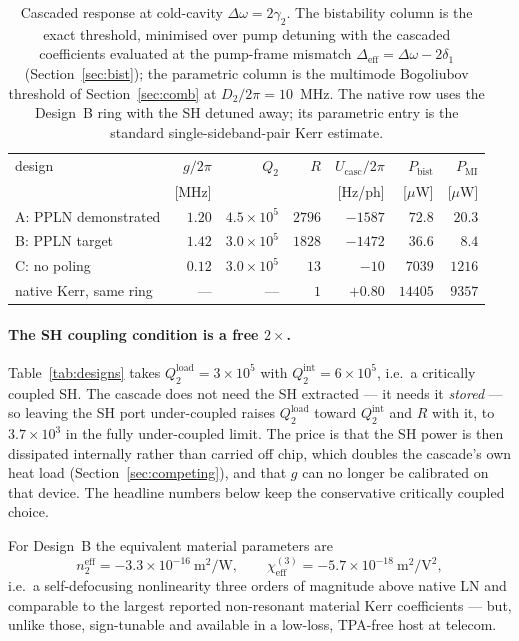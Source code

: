 \documentclass[11pt,a4paper]{article}
\newcommand{\chithree}{\chi^{(3)}}
\newcommand{\Dom}{\Delta\omega}
\newcommand{\Ucasc}{U_{\text{casc}}}
\begin{document}
\begin{table}[H]
\centering
\small
\begin{tabular}{lrrrrrr}
\toprule
design & $g/2\pi$ & $Q_2$ & $R$ & $\Ucasc/2\pi$
 & $P_{\text{bist}}$ & $P_{\text{MI}}$\\
 & [MHz] & & & [Hz/ph] & [$\mu$W] & [$\mu$W]\\
\midrule
A: PPLN demonstrated & $1.20$ & $4.5\!\times\!10^5$ & $2796$ & $-1587$ & $72.8$ & $20.3$\\
B: PPLN target       & $1.42$ & $3.0\!\times\!10^5$ & $1828$ & $-1472$ & $36.6$  & $8.4$\\
C: no poling         & $0.12$ & $3.0\!\times\!10^5$ & $13$   & $-10$   & $7039$& $1216$\\
\midrule
native Kerr, same ring & --- & --- & $1$ & $+0.80$ & $14405$ & $9357$\\
\bottomrule
\end{tabular}
\caption{Cascaded response at cold-cavity $\Dom=2\gamma_2$.  The
bistability column is the exact threshold, minimised over pump detuning
with the cascaded coefficients evaluated at the pump-frame mismatch
$\Delta_{\text{eff}}=\Dom-2\delta_1$ (Section~\ref{sec:bist}); the
parametric column is the multimode Bogoliubov threshold of
Section~\ref{sec:comb} at $D_2/2\pi=10$~MHz.  The native row uses the
Design~B ring with the SH detuned away; its parametric entry is the
standard single-sideband-pair Kerr estimate.}
\label{tab:summary}
\end{table}

\paragraph{The SH coupling condition is a free $2\times$.}  Table~\ref{tab:designs}
takes $Q_2^{\text{load}}=3\times10^5$ with $Q_2^{\text{int}}=6\times10^5$,
i.e.\ a critically coupled SH.  The cascade does not need the SH
extracted --- it needs it \emph{stored} --- so leaving the SH port
under-coupled raises $Q_2^{\text{load}}$ toward $Q_2^{\text{int}}$ and
$R$ with it, to $3.7\times10^3$ in the fully under-coupled limit.  The
price is that the SH power is then dissipated internally rather than
carried off chip, which doubles the cascade's own heat load
(Section~\ref{sec:competing}), and that $g$ can no longer be calibrated
on that device.  The headline numbers below keep the conservative
critically coupled choice.

For Design~B the equivalent material parameters are
\begin{equation}
  n_2^{\text{eff}}=-3.3\times10^{-16}\ \mathrm{m^2/W},\qquad
  \chithree_{\text{eff}}=-5.7\times10^{-18}\ \mathrm{m^2/V^2},
\end{equation}
i.e.\ a self-defocusing nonlinearity three orders of magnitude above
native LN and comparable to the largest reported non-resonant material
Kerr coefficients --- but, unlike those, sign-tunable and available in a
low-loss, TPA-free host at telecom.
\end{document}
